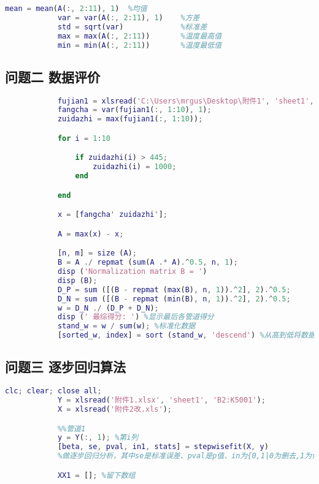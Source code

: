 \begin{appendices}
\begin{lstlisting}[language=matlab]
            mean = mean(A(:, 2:11), 1)  %均值
            var = var(A(:, 2:11), 1)    %方差
            std = sqrt(var)             %标准差
            max = max(A(:, 2:11))       %温度最高值
            min = min(A(:, 2:11))       %温度最低值
        \end{lstlisting}

    \subsection{问题二 数据评价}
        \begin{lstlisting}[language=matlab]
            %读取已经处理完毕的数据
            fujian1 = xlsread('C:\Users\mrgus\Desktop\附件1', 'sheet1', 'B2:K5001');
            fangcha = var(fujian1(:, 1:10), 1);
            zuidazhi = max(fujian1(:, 1:10));

            for i = 1:10

                if zuidazhi(i) > 445;
                    zuidazhi(i) = 1000;
                end

            end

            x = [fangcha' zuidazhi'];

            A = max(x) - x;

            [n, m] = size (A);
            B = A ./ repmat (sum(A .* A).^0.5, n, 1);
            disp ('Normalization matrix B = ')
            disp (B);
            D_P = sum ([(B - repmat (max(B), n, 1)).^2], 2).^0.5;
            D_N = sum ([(B - repmat (min(B), n, 1)).^2], 2).^0.5;
            w = D_N ./ (D_P + D_N);
            disp (' 最综得分: ') %显示最后各管道得分
            stand_w = w / sum(w); %标准化数据
            [sorted_w, index] = sort (stand_w, 'descend') %从高到低将数据进行排列
        \end{lstlisting}

    \subsection{问题三 逐步回归算法}
        \begin{lstlisting}[language=matlab]
            clc; clear; close all;
            Y = xlsread('附件1.xlsx', 'sheet1', 'B2:K5001');
            X = xlsread('附件2改.xls');

            %%管道1
            y = Y(:, 1); %第i列
            [beta, se, pval, in1, stats] = stepwisefit(X, y)
            %做逐步回归分析，其中se是标准误差、pval是p值、in为{0,1|0为删去,1为保留}

            XX1 = []; %留下数组


\end{lstlisting}
\end{appendices}
